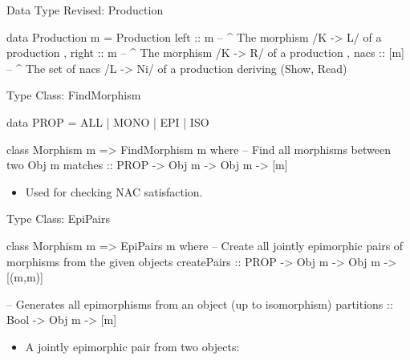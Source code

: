 \documentclass[xcolor=dvipsnames,pdf,11pt,handout]{beamer}
\newcommand{\bi}{\begin{itemize}}
\newcommand{\ei}{\end{itemize}}
\newcommand{\tm}{\item}
\begin{document}
\begin{frame}[fragile]{Data Type Revised: Production}{}

\color{blue}
\begin{haskell}
data Production m = Production
  { left :: m   -- ^ The morphism /K -> L/ of a production
  , right :: m  -- ^ The morphism /K -> R/ of a production
  , nacs :: [m] -- ^ The set of nacs /L -> Ni/ of a production
  }
  deriving (Show, Read)
\end{haskell}
\color{black}

\end{frame}

\begin{frame}[fragile]{Type Class: FindMorphism}{}

\color{blue}
\begin{haskell}
data PROP = ALL | MONO | EPI | ISO

\end{haskell}

\begin{haskell}
class Morphism m => FindMorphism m where
  -- Find all morphisms between two Obj m
  matches :: PROP -> Obj m -> Obj m -> [m]
\end{haskell}
\color{black}

\bi
\tm Used for checking NAC satisfaction.
\ei


\end{frame}

\begin{frame}[fragile]{Type Class: EpiPairs}{}

\color{blue}
\begin{haskell}
class Morphism m => EpiPairs m where
  -- Create all jointly epimorphic pairs of morphisms from the given objects
  createPairs :: PROP -> Obj m -> Obj m -> [(m,m)]
  
  -- Generates all epimorphisms from an object (up to isomorphism)
  partitions :: Bool -> Obj m -> [m]
\end{haskell}
\color{black}

\bi 
\tm A jointly epimorphic pair from two objects: \\
\centerline{}
\ei

\end{frame}
\end{document}
